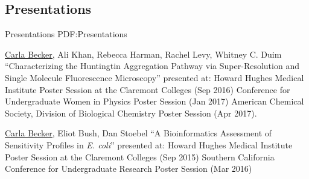 \documentclass[letterpaper,10pt,oneside]{article}
\begin{document}
\begin{body}

\section
{Presentations}
{Presentations}
{PDF:Presentations}

\SubBulletItem
\underline{Carla Becker,} Ali Khan, Rebecca Harman, Rachel Levy, Whitney C. Duim 
\SubBulletItem
“Characterizing the Huntingtin Aggregation Pathway via Super-Resolution and Single Molecule Fluorescence Microscopy” presented at:
\SubBulletItemBullet
Howard Hughes Medical Institute Poster Session at the Claremont Colleges (Sep 2016)
\SubBulletItemBullet Conference for Undergraduate Women in Physics Poster Session (Jan 2017)
\SubBulletItemBullet American Chemical Society, Division of Biological Chemistry Poster Session (Apr 2017).

\Gap
\SubBulletItem
\underline{Carla Becker,} Eliot Bush, Dan Stoebel
\SubBulletItem
“A Bioinformatics Assessment of Sensitivity Profiles in {\it E. coli}” presented at:
\SubBulletItemBullet Howard Hughes Medical Institute Poster Session at the Claremont Colleges (Sep 2015) 
\SubBulletItemBullet Southern California Conference for Undergraduate Research Poster Session (Mar 2016)

\end{body}
\thispagestyle{empty}



\end{document}
